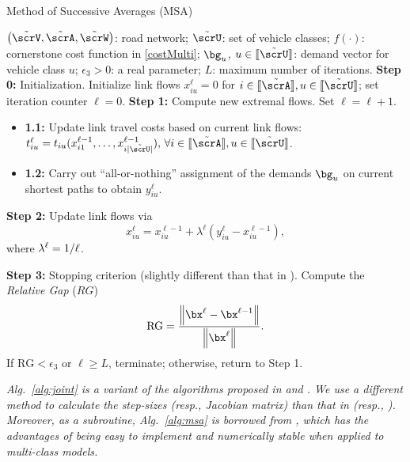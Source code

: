 \documentclass[3p]{elsarticle}
\begin{document}
	
	\begin{algorithm}
	\caption{Method of Successive Averages (MSA) \cite{noriega2007algorithmic}}
	\label{alg:msa}
	\begin{algorithmic}[1]
		\Require $\big( {\tilde\scrV, \tilde\scrA, \tilde\scrW} \big)$: road network; $\tilde{\scrU}$: set of vehicle classes; $f(\cdot)$: cornerstone cost function in \eqref{costMulti}; $\bg_u$, $u \in [\kern-0.15em[ \tilde\scrU 
		]\kern-0.15em]$: demand vector for vehicle class $u$; $\epsilon_3 > 0$: a real parameter; $L$: maximum number of iterations. 
		\State \textbf{Step 0:} Initialization. Initialize link flows $x^{\ell}_{iu} = 0$ for $i \in [\kern-0.15em[ \tilde\scrA]\kern-0.15em], u \in [\kern-0.15em[ \tilde\scrU 
		]\kern-0.15em] $; set iteration counter $\ell=0$.
		\State \textbf{Step 1:} Compute new extremal flows. Set $\ell = \ell + 1$.
		
		\begin{itemize}
			\item[] \textbf{1.1:} Update link travel costs based on current link flows: $t^{\ell}_{iu} = {t_{iu}}( {{x^{\ell-1}_{i1}}, \ldots ,{x^{\ell-1}_{i|\tilde\scrU|}}} ), \, \forall i \in [\kern-0.15em[ \tilde\scrA 
			]\kern-0.15em], u \in [\kern-0.15em[ \tilde\scrU 
			]\kern-0.15em]$.
			
			\item[] \textbf{1.2:} Carry out ``all-or-nothing'' assignment of the demands $\bg_u$ on current shortest paths to obtain $y^{\ell}_{iu}$.
			
		\end{itemize}
		\State \textbf{Step 2:} Update link flows via
		\[x^{\ell}_{iu} = x^{\ell-1}_{iu} + {\lambda ^\ell}\left( {y^{\ell}_{iu} - x^{\ell-1}_{iu}} \right),\]
		where ${\lambda ^\ell} = {1 \mathord{\left/
				{\vphantom {1 l}} \right.
				\kern-\nulldelimiterspace} \ell}$.
		
		\State \textbf{Step 3:} Stopping criterion (slightly different than that in \cite{noriega2007algorithmic}).
		Compute the \textit{Relative Gap} ($\textit{RG}$)
		\[\text{RG} = \frac{{{{\left\| {{\bx^{\ell}} - {\bx^{\ell-1}}} \right\|}}}}{{{{\left\| {{\bx^{\ell}}} \right\|}}}}.\]
		If $\text{RG} < \epsilon_3$ or $\ell \ge L$, terminate; otherwise, return to Step 1.
	\end{algorithmic}
\end{algorithm}

	
	
\begin{rmk}
	\em{Alg.~\ref{alg:joint} is a variant of the algorithms proposed in \cite{spiess1990gradient} and \cite{lundgren2008heuristic}. We use a different method to calculate the \textit{step-sizes} (resp., \textit{Jacobian matrix}) than that in \cite{spiess1990gradient} (resp., \cite{lundgren2008heuristic}). 
	Moreover, as a subroutine, Alg.~\ref{alg:msa} is borrowed from \cite{noriega2007algorithmic}, which has the advantages of being easy to implement and numerically stable when applied to multi-class models.
	}
\end{rmk}
\end{document}
